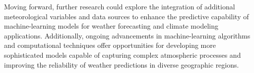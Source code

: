 \documentclass[12pt]{article}
\begin{document}
Moving forward, further research could explore the integration of additional meteorological variables and data sources to enhance the predictive capability of machine-learning models for weather forecasting and climate modeling applications. Additionally, ongoing advancements in machine-learning algorithms and computational techniques offer opportunities for developing more sophisticated models capable of capturing complex atmospheric processes and improving the reliability of weather predictions in diverse geographic regions.


\end{document}
